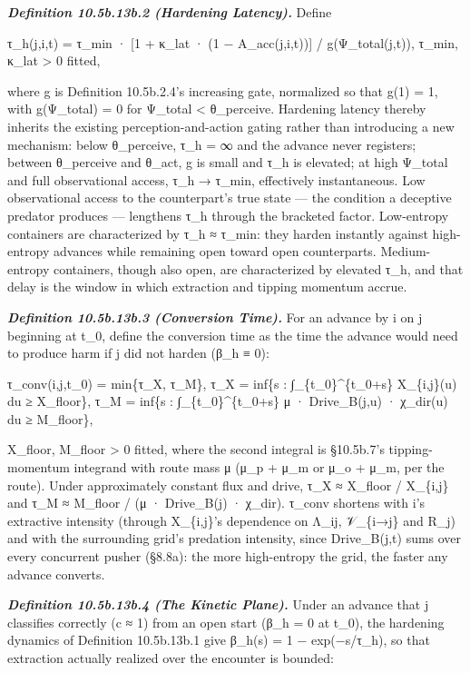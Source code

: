 \documentclass[
]{article}
\begin{document}
\emph{\textbf{Definition 10.5b.13b.2 (Hardening Latency).}} Define

τ\_h(j,i,t) = τ\_min · {[}1 + κ\_lat · (1 − A\_acc(j,i,t)){]} /
g(Ψ\_total(j,t)), τ\_min, κ\_lat \textgreater{} 0 fitted,

where g is Definition 10.5b.2.4's increasing gate, normalized so that
g(1) = 1, with g(Ψ\_total) = 0 for Ψ\_total \textless{} θ\_perceive.
Hardening latency thereby inherits the existing perception-and-action
gating rather than introducing a new mechanism: below θ\_perceive, τ\_h
= ∞ and the advance never registers; between θ\_perceive and θ\_act, g is
small and τ\_h is elevated; at high Ψ\_total and full observational
access, τ\_h → τ\_min, effectively instantaneous. Low observational
access to the counterpart's true state --- the condition a deceptive
predator produces --- lengthens τ\_h through the bracketed factor.
Low-entropy containers are characterized by τ\_h ≈ τ\_min: they harden
instantly against high-entropy advances while remaining open toward
open counterparts. Medium-entropy containers, though also open, are
characterized by elevated τ\_h, and that delay is the window in which
extraction and tipping momentum accrue.

\emph{\textbf{Definition 10.5b.13b.3 (Conversion Time).}} For an advance
by i on j beginning at t\_0, define the conversion time as the time the
advance would need to produce harm if j did not harden (β\_h ≡ 0):

τ\_conv(i,j,t\_0) = min\{τ\_X, τ\_M\},
τ\_X = inf\{s : ∫\_\{t\_0\}\^{}\{t\_0+s\} X\_\{i,j\}(u) du ≥ X\_floor\},
τ\_M = inf\{s : ∫\_\{t\_0\}\^{}\{t\_0+s\} μ · Drive\_B(j,u) · χ\_dir(u)
du ≥ M\_floor\},

X\_floor, M\_floor \textgreater{} 0 fitted, where the second integral is
§10.5b.7's tipping-momentum integrand with route mass μ (μ\_p + μ\_m or
μ\_o + μ\_m, per the route). Under approximately constant flux and drive,
τ\_X ≈ X\_floor / X\_\{i,j\} and τ\_M ≈ M\_floor / (μ · Drive\_B(j) ·
χ\_dir). τ\_conv shortens with i's extractive intensity (through
X\_\{i,j\}'s dependence on Λ\_ij, 𝒱\_\{i→j\} and R\_j) and with the
surrounding grid's predation intensity, since Drive\_B(j,t) sums over
every concurrent pusher (§8.8a): the more high-entropy the grid, the
faster any advance converts.

\emph{\textbf{Definition 10.5b.13b.4 (The Kinetic Plane).}} Under an
advance that j classifies correctly (c ≈ 1) from an open start (β\_h = 0
at t\_0), the hardening dynamics of Definition 10.5b.13b.1 give
β\_h(s) = 1 − exp(−s/τ\_h), so that extraction actually realized over the
encounter is bounded:
\end{document}
